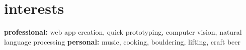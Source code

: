\documentclass[]{friggeri-cv} %
\begin{document}

\section{interests}

\textbf{professional:} web app creation, quick prototyping, computer vision, natural language processing \textbf{personal:} music, cooking, bouldering, lifting, craft beer 
\end{document}
